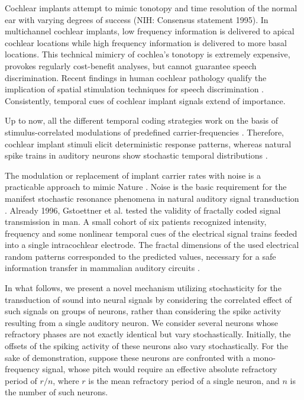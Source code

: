 \documentclass[prl,preprint,amsfonts,showpacs,showkeys]{revtex4}
\begin{document}
Cochlear implants attempt to mimic tonotopy and time resolution
of the normal ear with varying degrees of success (NIH: Consensus statement 1995).
In multichannel cochlear implants, low frequency information
is delivered to apical cochlear locations while high frequency information is delivered
to more basal locations. This technical mimicry of cochlea's
tonotopy is extremely expensive, provokes regularly cost-benefit analyses,
but cannot guarantee speech discrimination.
Recent findings in human cochlear pathology qualify the implication of spatial
stimulation techniques for speech discrimination \cite{khan-2005}.
Consistently, temporal cues of cochlear implant signals extend of importance.

Up to now, all the different temporal coding strategies work on the basis
of stimulus-correlated modulations of predefined carrier-frequencies \cite{wilson-03,rubinstein-2004}.
Therefore, cochlear implant stimuli elicit deterministic response patterns,
whereas natural spike trains in auditory neurons
show stochastic temporal distributions \cite{ehrenb-svozil,moore-2003}.

The modulation or replacement of implant carrier rates with noise is a practicable approach
to mimic Nature \cite{morse-1999,morse-1999b}.
Noise is the basic requirement for the manifest stochastic resonance phenomena
in natural auditory signal transduction \cite{ehrenb-svozil99}.
Already 1996, Gstoettner et al. \cite{gstoettner-1996} tested the validity of fractally coded signal transmission in man.
A small cohort of six patients recognized intensity,
frequency and some nonlinear temporal cues of the electrical signal trains
feeded into a single intracochlear electrode.
The fractal dimensions of the used electrical random patterns
corresponded to the predicted values,
necessary for a safe information transfer in mammalian auditory circuits \cite{svoz-ehr,svoz-ehr2}.

In what follows, we present a novel mechanism utilizing stochasticity
for the transduction of sound into neural signals by considering the correlated
effect of such signals on groups of neurons, rather than considering the spike activity resulting from
a single auditory neuron.
We consider several neurons whose refractory phases are not exactly identical but vary stochastically.
Initially, the offsets of the spiking activity of these neurons also vary stochastically.
For the sake of demonstration,
suppose these neurons are confronted with a mono-frequency signal, whose pitch would require an
effective absolute refractory period of $r/n$, where $r$ is the mean refractory period
of a single neuron, and $n$ is the number of such neurons.
\end{document}
